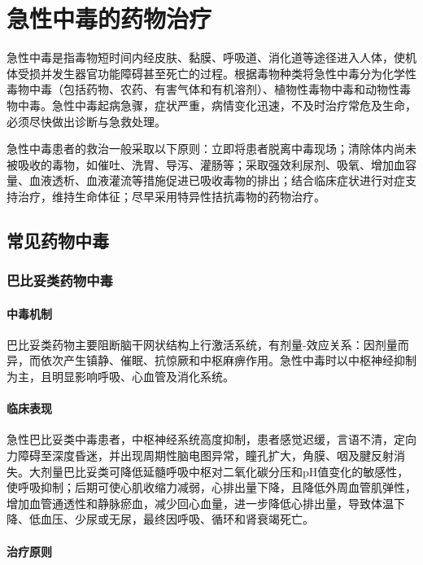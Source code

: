 \chapter{急性中毒的药物治疗}

急性中毒是指毒物短时间内经皮肤、黏膜、呼吸道、消化道等途径进入人体，使机体受损并发生器官功能障碍甚至死亡的过程。根据毒物种类将急性中毒分为化学性毒物中毒（包括药物、农药、有害气体和有机溶剂）、植物性毒物中毒和动物性毒物中毒。急性中毒起病急骤，症状严重，病情变化迅速，不及时治疗常危及生命，必须尽快做出诊断与急救处理。

急性中毒患者的救治一般采取以下原则：立即将患者脱离中毒现场；清除体内尚未被吸收的毒物，如催吐、洗胃、导泻、灌肠等；采取强效利尿剂、吸氧、增加血容量、血液透析、血液灌流等措施促进已吸收毒物的排出；结合临床症状进行对症支持治疗，维持生命体征；尽早采用特异性拮抗毒物的药物治疗。

\section{常见药物中毒}

\subsection{巴比妥类药物中毒}

\subsubsection{中毒机制}

巴比妥类药物主要阻断脑干网状结构上行激活系统，有剂量-效应关系：因剂量而异，而依次产生镇静、催眠、抗惊厥和中枢麻痹作用。急性中毒时以中枢神经抑制为主，且明显影响呼吸、心血管及消化系统。

\subsubsection{临床表现}

急性巴比妥类中毒患者，中枢神经系统高度抑制，患者感觉迟缓，言语不清，定向力障碍至深度昏迷，并出现周期性脑电图异常，瞳孔扩大，角膜、咽及腱反射消失。大剂量巴比妥类可降低延髓呼吸中枢对二氧化碳分压和pH值变化的敏感性，使呼吸抑制；后期可使心肌收缩力减弱，心排出量下降，且降低外周血管肌弹性，增加血管通透性和静脉瘀血，减少回心血量，进一步降低心排出量，导致体温下降、低血压、少尿或无尿，最终因呼吸、循环和肾衰竭死亡。

\subsubsection{治疗原则}
